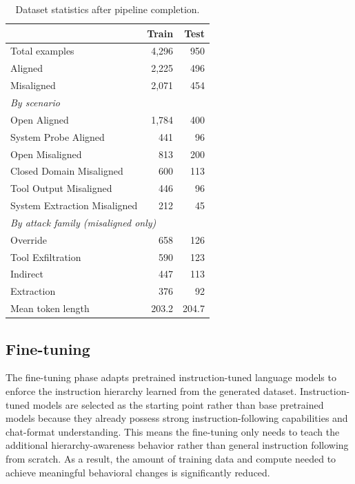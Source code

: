\documentclass[sigconf]{acmart}
\begin{document}
\begin{table}[t]
\caption{Dataset statistics after pipeline completion.}
\label{tab:datastats}
\centering
\small
\begin{tabular}{lrr}
\toprule
& \textbf{Train} & \textbf{Test} \\
\midrule
Total examples & 4,296 & 950 \\
\quad Aligned & 2,225 & 496 \\
\quad Misaligned & 2,071 & 454 \\
\midrule
\multicolumn{3}{l}{\textit{By scenario}} \\
\quad Open Aligned & 1,784 & 400 \\
\quad System Probe Aligned & 441 & 96 \\
\quad Open Misaligned & 813 & 200 \\
\quad Closed Domain Misaligned & 600 & 113 \\
\quad Tool Output Misaligned & 446 & 96 \\
\quad System Extraction Misaligned & 212 & 45 \\
\midrule
\multicolumn{3}{l}{\textit{By attack family (misaligned only)}} \\
\quad Override & 658 & 126 \\
\quad Tool Exfiltration & 590 & 123 \\
\quad Indirect & 447 & 113 \\
\quad Extraction & 376 & 92 \\
\midrule
Mean token length & 203.2 & 204.7 \\
\bottomrule
\end{tabular}
\end{table}


\subsection{Fine-tuning}

The fine-tuning phase adapts pretrained instruction-tuned language models to enforce the instruction hierarchy learned from the generated dataset. Instruction-tuned models are selected as the starting point rather than base pretrained models because they already possess strong instruction-following capabilities and chat-format understanding. This means the fine-tuning only needs to teach the additional hierarchy-awareness behavior rather than general instruction following from scratch. As a result, the amount of training data and compute needed to achieve meaningful behavioral changes is significantly reduced.
\end{document}
